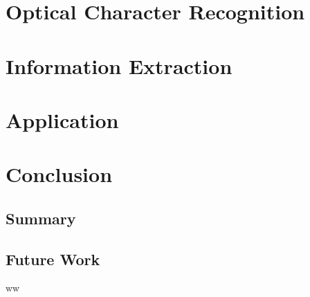 \documentclass[11pt]{article}
\begin{document}
\section{Optical Character Recognition}

\section{Information Extraction}

\section{Application}

\section{Conclusion}
    \subsection{Summary}
    \subsection{Future Work}
    ww

%

\end{document}
